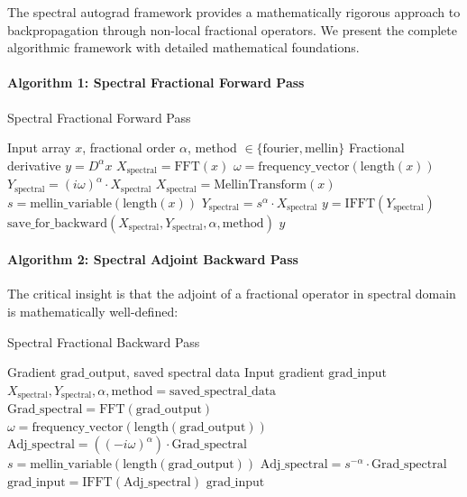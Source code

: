 The spectral autograd framework provides a mathematically rigorous approach to backpropagation through non-local fractional operators. We present the complete algorithmic framework with detailed mathematical foundations.

\paragraph{Algorithm 1: Spectral Fractional Forward Pass}

\begin{algorithm}[h]
\caption{Spectral Fractional Forward Pass}
\begin{algorithmic}[1]
\Require Input array $x$, fractional order $\alpha$, method $\in \{\text{fourier}, \text{mellin}\}$
\Ensure Fractional derivative $y = D^{\alpha} x$
    \State $X_{\text{spectral}} = \text{FFT}(x)$
    \State $\omega = \text{frequency\_vector}(\text{length}(x))$
    \State $Y_{\text{spectral}} = (i\omega)^{\alpha} \cdot X_{\text{spectral}}$
    \State $X_{\text{spectral}} = \text{MellinTransform}(x)$
    \State $s = \text{mellin\_variable}(\text{length}(x))$
    \State $Y_{\text{spectral}} = s^{\alpha} \cdot X_{\text{spectral}}$
\EndIf
\State $y = \text{IFFT}(Y_{\text{spectral}})$ 
\State $\text{save\_for\_backward}(X_{\text{spectral}}, Y_{\text{spectral}}, \alpha, \text{method})$
\Return $y$
\end{algorithmic}
\end{algorithm}

\paragraph{Algorithm 2: Spectral Adjoint Backward Pass}

The critical insight is that the adjoint of a fractional operator in spectral domain is mathematically well-defined:

\begin{algorithm}[h]
\caption{Spectral Fractional Backward Pass}
\begin{algorithmic}[1]
\Require Gradient $\text{grad\_output}$, saved spectral data
\Ensure Input gradient $\text{grad\_input}$
\State $X_{\text{spectral}}, Y_{\text{spectral}}, \alpha, \text{method} = \text{saved\_spectral\_data}$
\State $\text{Grad\_spectral} = \text{FFT}(\text{grad\_output})$ 
    \State $\omega = \text{frequency\_vector}(\text{length}(\text{grad\_output}))$
    \State $\text{Adj\_spectral} = ((-i\omega)^{\alpha}) \cdot \text{Grad\_spectral}$
    \State $s = \text{mellin\_variable}(\text{length}(\text{grad\_output}))$
    \State $\text{Adj\_spectral} = s^{-\alpha} \cdot \text{Grad\_spectral}$
\EndIf
\State $\text{grad\_input} = \text{IFFT}(\text{Adj\_spectral})$ 
\Return $\text{grad\_input}$
\end{algorithmic}
\end{algorithm}


